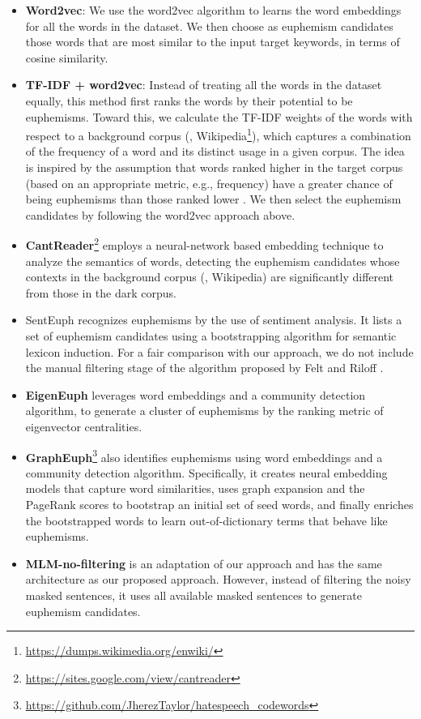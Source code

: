\begin{itemize}%
	\item \textbf{Word2vec}: We use the word2vec algorithm \cite{mikolov2013distributed,mikolov2013efficient}  to learns the word embeddings for all the words  in the dataset. We then choose as euphemism candidates those words that are most similar to the input target keywords, in terms of  cosine similarity. 
	\item \textbf{TF-IDF + word2vec}: Instead of treating all the words in the dataset equally, this method first ranks the words by their potential to be euphemisms. Toward this, we calculate the TF-IDF weights of the words \cite{manning2008introduction} with respect to a background corpus (\ie, Wikipedia\footnote{\url{https://dumps.wikimedia.org/enwiki/}}), which captures a combination of the frequency of a word and its distinct usage in a given corpus. The idea is inspired by the assumption that words ranked higher in the target corpus (based on an appropriate metric, e.g., frequency) have a greater chance of being euphemisms than those ranked lower \cite{magu2018determining}.  We then select the euphemism candidates by following the word2vec approach above.  
	\item \textbf{CantReader}\footnote{\url{https://sites.google.com/view/cantreader}} \cite{yuan2018reading} employs a neural-network based embedding technique to analyze the semantics of words, detecting the euphemism candidates whose contexts in the background corpus (\eg, Wikipedia) are significantly different from those in the dark corpus. 
	\item SentEuph \cite{felt2020recognizing} recognizes euphemisms by the use of sentiment analysis. It lists a set of euphemism candidates using a bootstrapping algorithm for semantic lexicon induction. For a fair comparison with our approach, we do not include the manual filtering stage of the algorithm proposed by Felt and Riloff \cite{felt2020recognizing}. 
	\item \textbf{EigenEuph} \cite{magu2018determining} leverages word embeddings and a community detection algorithm, to generate a cluster of euphemisms by the ranking metric of eigenvector centralities. %
	\item \textbf{GraphEuph}\footnote{\url{https://github.com/JherezTaylor/hatespeech_codewords}} \cite{taylor2017surfacing} also identifies euphemisms using word embeddings and a community detection algorithm. Specifically, it creates neural embedding models that capture word similarities, uses graph expansion and the PageRank scores \cite{page1999pagerank} to bootstrap an initial set of seed words, and finally enriches the bootstrapped words to learn out-of-dictionary terms that behave like euphemisms. 
	\item \textbf{MLM-no-filtering} is an adaptation of our approach and has the same architecture as our proposed approach. However, instead of filtering the noisy masked sentences, it uses all available masked sentences to generate euphemism candidates. 
\end{itemize}

